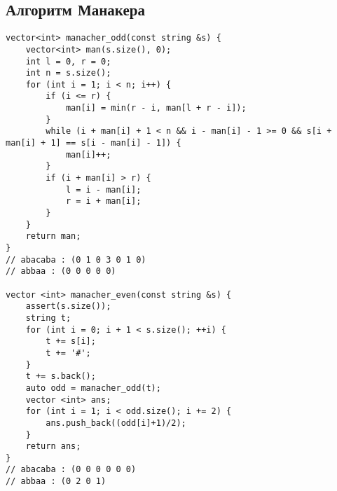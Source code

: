 \subsection{Алгоритм Манакера}
\begin{lstlisting}
vector<int> manacher_odd(const string &s) {
    vector<int> man(s.size(), 0);
    int l = 0, r = 0;
    int n = s.size();
    for (int i = 1; i < n; i++) {
        if (i <= r) {
            man[i] = min(r - i, man[l + r - i]);
        }
        while (i + man[i] + 1 < n && i - man[i] - 1 >= 0 && s[i + man[i] + 1] == s[i - man[i] - 1]) {
            man[i]++;
        }
        if (i + man[i] > r) {
            l = i - man[i];
            r = i + man[i];
        }
    }
    return man;
}
// abacaba : (0 1 0 3 0 1 0)
// abbaa : (0 0 0 0 0)

vector <int> manacher_even(const string &s) {
    assert(s.size());
    string t;
    for (int i = 0; i + 1 < s.size(); ++i) {
        t += s[i];
        t += '#';
    }
    t += s.back();
    auto odd = manacher_odd(t);
    vector <int> ans;
    for (int i = 1; i < odd.size(); i += 2) {
        ans.push_back((odd[i]+1)/2);
    }
    return ans;
}
// abacaba : (0 0 0 0 0 0)
// abbaa : (0 2 0 1)
\end{lstlisting}
